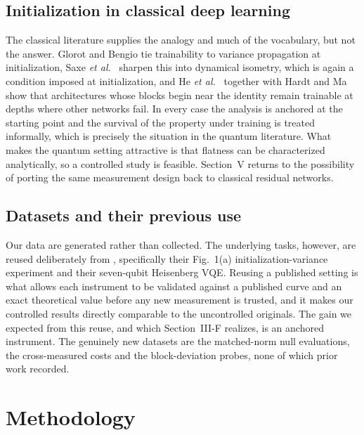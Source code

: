 \documentclass[conference]{IEEEtran}%
\begin{document}
\subsection{Initialization in classical deep learning}
The classical literature supplies the analogy and much of the vocabulary, but not the answer. Glorot and Bengio \cite{glorot} tie trainability to variance propagation at initialization, Saxe \emph{et al.}~\cite{saxe} sharpen this into dynamical isometry, which is again a condition imposed at initialization, and He \emph{et al.}~\cite{resnet} together with Hardt and Ma \cite{hardtma} show that architectures whose blocks begin near the identity remain trainable at depths where other networks fail. In every case the analysis is anchored at the starting point and the survival of the property under training is treated informally, which is precisely the situation in the quantum literature. What makes the quantum setting attractive is that flatness can be characterized analytically, so a controlled study is feasible. Section~V returns to the possibility of porting the same measurement design back to classical residual networks.

\subsection{Datasets and their previous use}
Our data are generated rather than collected. The underlying tasks, however, are reused deliberately from \cite{grant}, specifically their Fig.~1(a) initialization-variance experiment and their seven-qubit Heisenberg VQE. Reusing a published setting is what allows each instrument to be validated against a published curve and an exact theoretical value before any new measurement is trusted, and it makes our controlled results directly comparable to the uncontrolled originals. The gain we expected from this reuse, and which Section~III-F realizes, is an anchored instrument. The genuinely new datasets are the matched-norm null evaluations, the cross-measured costs and the block-deviation probes, none of which prior work recorded.

\section{Methodology}
\end{document}
